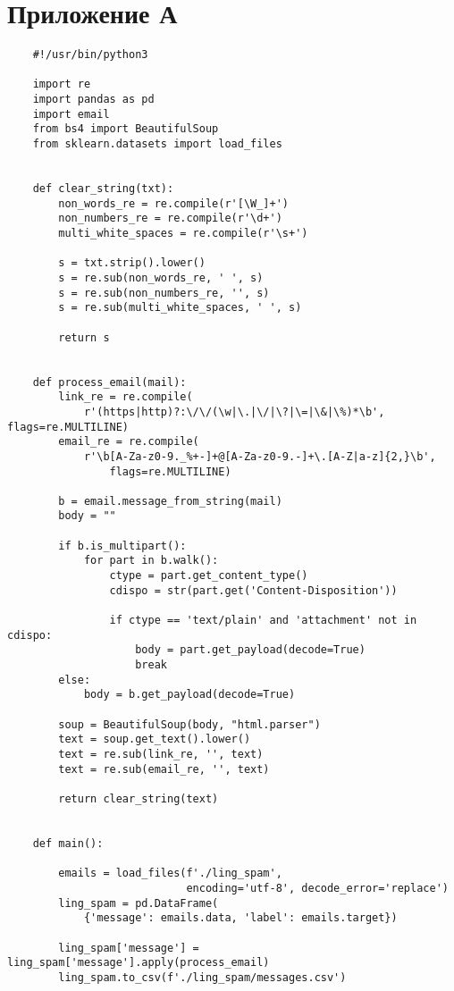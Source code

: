\chapter*{Приложение А}\label{App1}

\begin{lstlisting}
    #!/usr/bin/python3

    import re
    import pandas as pd
    import email
    from bs4 import BeautifulSoup
    from sklearn.datasets import load_files
    
    
    def clear_string(txt):
        non_words_re = re.compile(r'[\W_]+')
        non_numbers_re = re.compile(r'\d+')
        multi_white_spaces = re.compile(r'\s+')
    
        s = txt.strip().lower()
        s = re.sub(non_words_re, ' ', s)
        s = re.sub(non_numbers_re, '', s)
        s = re.sub(multi_white_spaces, ' ', s)
    
        return s
    
    
    def process_email(mail):
        link_re = re.compile(
            r'(https|http)?:\/\/(\w|\.|\/|\?|\=|\&|\%)*\b', flags=re.MULTILINE)
        email_re = re.compile(
            r'\b[A-Za-z0-9._%+-]+@[A-Za-z0-9.-]+\.[A-Z|a-z]{2,}\b', 
                flags=re.MULTILINE)
    
        b = email.message_from_string(mail)
        body = ""
    
        if b.is_multipart():
            for part in b.walk():
                ctype = part.get_content_type()
                cdispo = str(part.get('Content-Disposition'))
    
                if ctype == 'text/plain' and 'attachment' not in cdispo:
                    body = part.get_payload(decode=True)
                    break
        else:
            body = b.get_payload(decode=True)
    
        soup = BeautifulSoup(body, "html.parser")
        text = soup.get_text().lower()
        text = re.sub(link_re, '', text)
        text = re.sub(email_re, '', text)
    
        return clear_string(text)
    
    
    def main():
    
        emails = load_files(f'./ling_spam',
                            encoding='utf-8', decode_error='replace')
        ling_spam = pd.DataFrame(
            {'message': emails.data, 'label': emails.target})
    
        ling_spam['message'] = ling_spam['message'].apply(process_email)
        ling_spam.to_csv(f'./ling_spam/messages.csv')
    

\end{lstlisting}
